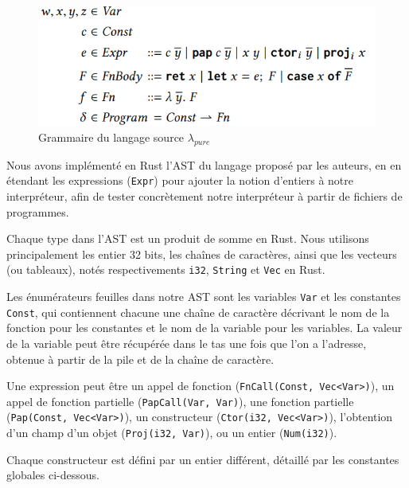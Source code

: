 \documentclass{rapportECL}
\begin{document}
\begin{figure}[hbt!]
	\centering
	\includegraphics[scale=0.80]{logos/grammaire.png}
	\caption{Grammaire du langage source $\lambda_{pure}$}
	\label{fig:grammaire pure}
\end{figure}
\FloatBarrier

Nous avons implémenté en Rust l'AST du langage proposé par les auteurs, en en étendant les 
expressions (\verb|Expr|) pour ajouter la notion d'entiers à notre interpréteur,
afin de tester concrètement notre interpréteur à partir de fichiers de programmes.

Chaque type dans l'AST est un produit de somme en Rust. Nous utilisons principalement les entier 32 bits, les chaînes de caractères,
ainsi que les vecteurs (ou tableaux), notés respectivements \verb|i32|, \verb|String| et \verb|Vec| en Rust.

\bigskip

Les énumérateurs feuilles dans notre AST sont les variables \verb|Var| et les constantes \verb|Const|,
qui contiennent chacune une chaîne de caractère décrivant le nom de la fonction pour les constantes et 
le nom de la variable pour les variables. La valeur de la variable peut être récupérée dans le tas
une fois que l'on a l'adresse, obtenue à partir de la pile et de la chaîne de caractère.

\medskip

Une expression peut être un appel de fonction (\verb|FnCall(Const, Vec<Var>)|), un appel de fonction partielle (\verb|PapCall(Var, Var)|),
une fonction partielle (\verb|Pap(Const, Vec<Var>)|), un constructeur (\verb|Ctor(i32, Vec<Var>)|), 
l'obtention d'un champ d'un objet (\verb|Proj(i32, Var)|), ou un entier (\verb|Num(i32)|).

\medskip

Chaque constructeur est défini par un entier différent, détaillé par les constantes globales ci-dessous.
\end{document}

